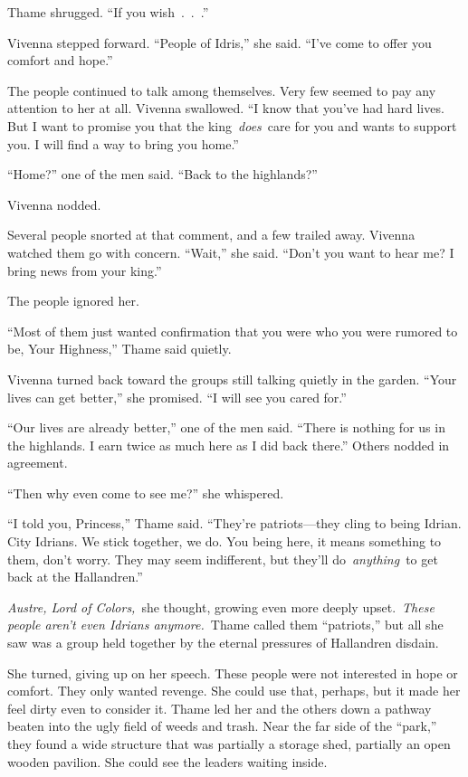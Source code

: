Thame shrugged. “If you wish~.~.~.”

Vivenna stepped forward. “People of Idris,” she said. “I’ve come to offer you comfort and hope.”

The people continued to talk among themselves. Very few seemed to pay any attention to her at all. Vivenna swallowed. “I know that you’ve had hard lives. But I want to promise you that the king~\textit{does}~care for you and wants to support you. I will find a way to bring you home.”

“Home?” one of the men said. “Back to the highlands?”

Vivenna nodded.

Several people snorted at that comment, and a few trailed away. Vivenna watched them go with concern. “Wait,” she said. “Don’t you want to hear me? I bring news from your king.”

The people ignored her.

“Most of them just wanted confirmation that you were who you were rumored to be, Your Highness,” Thame said quietly.

Vivenna turned back toward the groups still talking quietly in the garden. “Your lives can get better,” she promised. “I will see you cared for.”

“Our lives are already better,” one of the men said. “There is nothing for us in the highlands. I earn twice as much here as I did back there.” Others nodded in agreement.

“Then why even come to see me?” she whispered.

“I told you, Princess,” Thame said. “They’re patriots—they cling to being Idrian. City Idrians. We stick together, we do. You being here, it means something to them, don’t worry. They may seem indifferent, but they’ll do~\textit{anything}~to get back at the Hallandren.”

\textit{Austre, Lord of Colors,}~she thought, growing even more deeply upset.~\textit{These people aren’t even Idrians anymore.}~Thame called them “patriots,” but all she saw was a group held together by the eternal pressures of Hallandren disdain.

She turned, giving up on her speech. These people were not interested in hope or comfort. They only wanted revenge. She could use that, perhaps, but it made her feel dirty even to consider it. Thame led her and the others down a pathway beaten into the ugly field of weeds and trash. Near the far side of the “park,” they found a wide structure that was partially a storage shed, partially an open wooden pavilion. She could see the leaders waiting inside.

